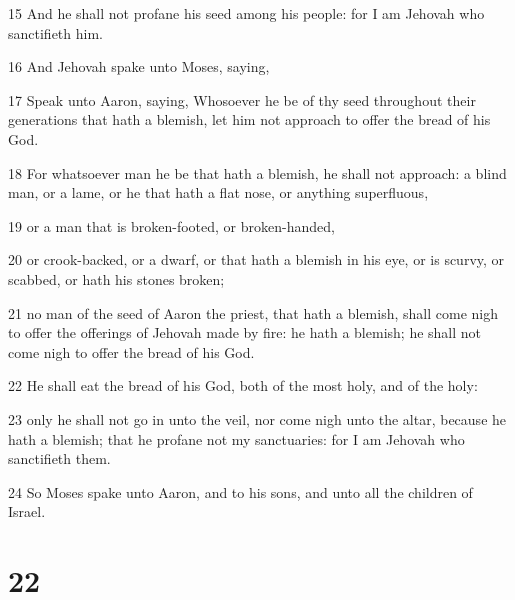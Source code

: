\par 15 And he shall not profane his seed among his people: for I am Jehovah who sanctifieth him.
\par 16 And Jehovah spake unto Moses, saying,
\par 17 Speak unto Aaron, saying, Whosoever he be of thy seed throughout their generations that hath a blemish, let him not approach to offer the bread of his God.
\par 18 For whatsoever man he be that hath a blemish, he shall not approach: a blind man, or a lame, or he that hath a flat nose, or anything superfluous,
\par 19 or a man that is broken-footed, or broken-handed,
\par 20 or crook-backed, or a dwarf, or that hath a blemish in his eye, or is scurvy, or scabbed, or hath his stones broken;
\par 21 no man of the seed of Aaron the priest, that hath a blemish, shall come nigh to offer the offerings of Jehovah made by fire: he hath a blemish; he shall not come nigh to offer the bread of his God.
\par 22 He shall eat the bread of his God, both of the most holy, and of the holy:
\par 23 only he shall not go in unto the veil, nor come nigh unto the altar, because he hath a blemish; that he profane not my sanctuaries: for I am Jehovah who sanctifieth them.
\par 24 So Moses spake unto Aaron, and to his sons, and unto all the children of Israel.

\chapter{22}

